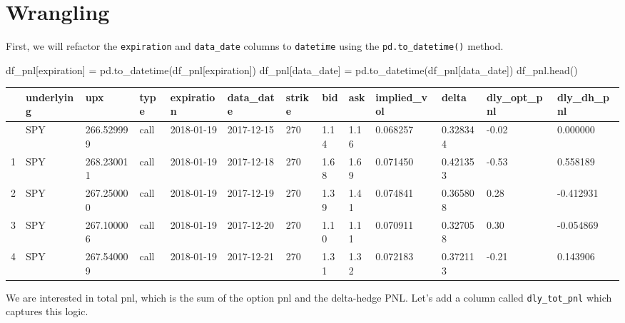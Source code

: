 \documentclass[
  letterpaper,
  DIV=11,
  numbers=noendperiod]{scrreprt}
\newenvironment{Shaded}{\begin{snugshade}}{\end{snugshade}}
\newcommand{\NormalTok}[1]{\textcolor[rgb]{0.00,0.23,0.31}{#1}}
\newcommand{\OperatorTok}[1]{\textcolor[rgb]{0.37,0.37,0.37}{#1}}
\newcommand{\StringTok}[1]{\textcolor[rgb]{0.13,0.47,0.30}{#1}}
\begin{document}
\hypertarget{wrangling}{%
\section{Wrangling}\label{wrangling}}

First, we will refactor the \texttt{expiration} and \texttt{data\_date}
columns to \texttt{datetime} using the \texttt{pd.to\_datetime()}
method.

\begin{Shaded}
\begin{Highlighting}[]
\NormalTok{df\_pnl[}\StringTok{\textquotesingle{}expiration\textquotesingle{}}\NormalTok{] }\OperatorTok{=}\NormalTok{ pd.to\_datetime(df\_pnl[}\StringTok{\textquotesingle{}expiration\textquotesingle{}}\NormalTok{])}
\NormalTok{df\_pnl[}\StringTok{\textquotesingle{}data\_date\textquotesingle{}}\NormalTok{] }\OperatorTok{=}\NormalTok{ pd.to\_datetime(df\_pnl[}\StringTok{\textquotesingle{}data\_date\textquotesingle{}}\NormalTok{])}
\NormalTok{df\_pnl.head()}
\end{Highlighting}
\end{Shaded}

\begin{longtable}[]{@{}lllllllllllll@{}}
\toprule\noalign{}
& underlying & upx & type & expiration & data\_date & strike & bid & ask
& implied\_vol & delta & dly\_opt\_pnl & dly\_dh\_pnl \\
\midrule\noalign{}
\endhead
\bottomrule\noalign{}
\endlastfoot
0 & SPY & 266.529999 & call & 2018-01-19 & 2017-12-15 & 270 & 1.14 &
1.16 & 0.068257 & 0.328344 & -0.02 & 0.000000 \\
1 & SPY & 268.230011 & call & 2018-01-19 & 2017-12-18 & 270 & 1.68 &
1.69 & 0.071450 & 0.421353 & -0.53 & 0.558189 \\
2 & SPY & 267.250000 & call & 2018-01-19 & 2017-12-19 & 270 & 1.39 &
1.41 & 0.074841 & 0.365808 & 0.28 & -0.412931 \\
3 & SPY & 267.100006 & call & 2018-01-19 & 2017-12-20 & 270 & 1.10 &
1.11 & 0.070911 & 0.327058 & 0.30 & -0.054869 \\
4 & SPY & 267.540009 & call & 2018-01-19 & 2017-12-21 & 270 & 1.31 &
1.32 & 0.072183 & 0.372113 & -0.21 & 0.143906 \\
\end{longtable}

We are interested in total pnl, which is the sum of the option pnl and
the delta-hedge PNL. Let's add a column called \texttt{dly\_tot\_pnl}
which captures this logic.
\end{document}

